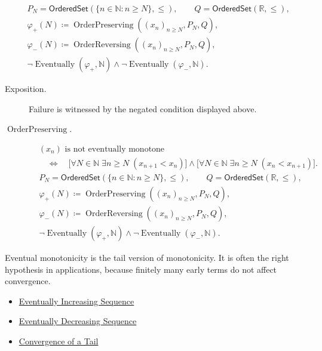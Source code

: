 \begin{remark*}
\[
\begin{aligned}
&P_N=\mathsf{OrderedSet}(\{n\in\mathbb{N}:n\ge N\},\leq),\qquad
Q=\mathsf{OrderedSet}(\mathbb{R},\leq),\\
&\varphi_{+}(N)\coloneqq
\operatorname{OrderPreserving}((x_n)_{n\ge N},P_N,Q),\\
&\varphi_{-}(N)\coloneqq
\operatorname{OrderReversing}((x_n)_{n\ge N},P_N,Q),\\
&\neg\operatorname{Eventually}(\varphi_{+},\mathbb{N})
\land
\neg\operatorname{Eventually}(\varphi_{-},\mathbb{N}).
\end{aligned}
\]
\end{remark*}
\begin{remark*}
\begin{description}
  \item[Exposition.]
Failure is witnessed by the negated condition displayed above.
  \item[\(\operatorname{OrderPreserving}.\)]
\[
\begin{aligned}
&(x_n)\text{ is not eventually monotone}\\
&\quad\Longleftrightarrow\quad
\bigl[\forall N\in\mathbb{N}\;\exists n\ge N\;(x_{n+1}<x_n)\bigr]
\land
\bigl[\forall N\in\mathbb{N}\;\exists n\ge N\;(x_n<x_{n+1})\bigr].
\end{aligned}
\]
\[
\begin{aligned}
&P_N=\mathsf{OrderedSet}(\{n\in\mathbb{N}:n\ge N\},\leq),\qquad
Q=\mathsf{OrderedSet}(\mathbb{R},\leq),\\
&\varphi_{+}(N)\coloneqq
\operatorname{OrderPreserving}((x_n)_{n\ge N},P_N,Q),\\
&\varphi_{-}(N)\coloneqq
\operatorname{OrderReversing}((x_n)_{n\ge N},P_N,Q),\\
&\neg\operatorname{Eventually}(\varphi_{+},\mathbb{N})
\land
\neg\operatorname{Eventually}(\varphi_{-},\mathbb{N}).
\end{aligned}
\]
\end{description}
\end{remark*}

\begin{remark*}[Interpretation]
Eventual monotonicity is the tail version of monotonicity. It is often the
right hypothesis in applications, because finitely many early terms do not
affect convergence.
\end{remark*}

\begin{dependencies}
\begin{itemize}
  \item \hyperref[def:eventually-increasing-sequence]{Eventually Increasing Sequence}
  \item \hyperref[def:eventually-decreasing-sequence]{Eventually Decreasing Sequence}
  \item \hyperref[def:m-tail]{Convergence of a Tail}
\end{itemize}
\end{dependencies}

